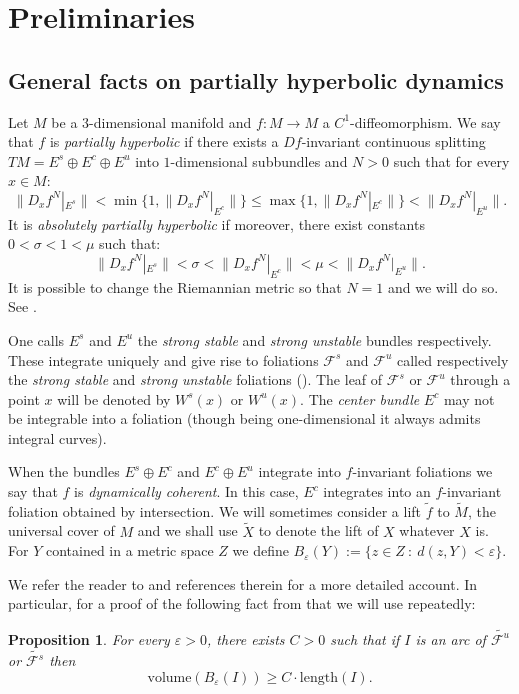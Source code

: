 \documentclass[11pt]{amsart} %
\newcommand{\Es}{E^s}
\newcommand{\Ec}{E^c}
\newcommand{\Eu}{E^u}
\newcommand{\Ws}{W^s}
\newcommand{\Wu}{W^u}
\newcommand{\Fs}{\mathcal{F}^s}
\newcommand{\Fu}{\mathcal{F}^u}
\newcommand{\tFs}{\tilde{\mathcal{F}^s}}
\newcommand{\tFu}{\tilde{\mathcal{F}^u}}
\newcommand{\eps}{\varepsilon}
\numberwithin{equation}{section}
\newtheorem{prop}[equation]{Proposition}
\theoremstyle{remark}
\begin{document}
%

\section{Preliminaries}\label{s.prelim}
\subsection{General facts on partially hyperbolic dynamics}\label{ss.PH}

Let $M$ be a 3-dimensional manifold and $f: M \to M$ a $C^1$-diffeomorphism. We say that $f$ is \emph{partially hyperbolic} if there exists a $Df$-invariant continuous splitting $TM=\Es \oplus \Ec \oplus \Eu$ into $1$-dimensional subbundles and $N>0$ such that for every $x\in M$: 
\[
    \|D_xf^N|_{\Es} \| < \min\{ 1, \|D_xf^N|_{\Ec} \|\} \leq \max \{ 1, \|D_xf^N|_{\Ec} \|\} < \|D_x f^N|_{\Eu}\| .
\]
It is \emph{absolutely partially hyperbolic} if moreover, there exist constants $0<\sigma<1<\mu$ such that:
\[
    \|D_xf^N|_{\Es} \| < \sigma <  \|D_xf^N|_{\Ec}\|  < \mu < \|D_x f^N |_{\Eu}\| .
\]
It is possible to change the Riemannian metric so that $N=1$ and we will do so. See \cite{Gourmelon}. 

One calls $\Es$ and $\Eu$ the \emph{strong stable} and \emph{strong unstable} bundles respectively. These integrate uniquely and give rise to foliations $\Fs$ and $\Fu$ called respectively the \emph{strong stable} and \emph{strong unstable} foliations (\cite{HPS}). The leaf of $\Fs$ or $\Fu$ through a point $x$ will be denoted by $\Ws(x)$ or $\Wu(x)$. The \emph{center bundle} $\Ec$ may not be integrable into a foliation (though being one-dimensional it always admits integral curves). 

When the bundles $\Es \oplus \Ec$ and $\Ec \oplus \Eu$ integrate into $f$-invariant foliations we say that $f$ is \emph{dynamically coherent}. In this case, $\Ec$ integrates into an $f$-invariant foliation obtained by intersection. We will sometimes consider a lift $\tilde f$ to $\tilde M$, the universal cover of $M$ and we shall use $\tilde X$ to denote the lift of $X$ whatever $X$ is.  For $Y$ contained in a metric space $Z$ we define $B_\eps(Y):=\{ z \in Z \ : \ d(z,Y) < \eps \}$. 

We refer the reader to \cite{HP-Survey} and references therein for a more detailed account. In particular, for a proof of the following fact from \cite{BI} that we will use repeatedly:


\begin{prop}\label{p-volvslength}
For every $\eps>0$, there exists $C>0$ such that if $I$ is an arc of $\tFu$ or $\tFs$ then $$\mathrm{volume}( B_\eps( I)) \geq C \cdot \mathrm{length}(I) .$$
\end{prop} 
\end{document}
